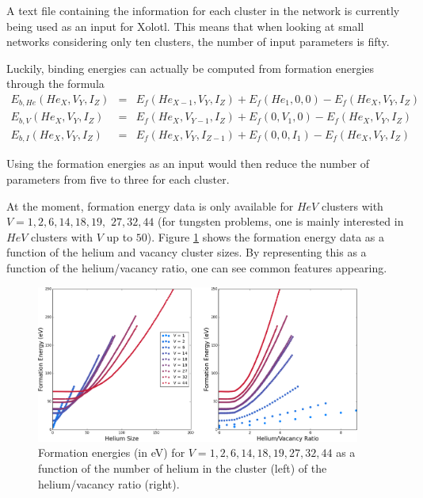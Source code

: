 \documentclass{article}
\begin{document}
A text file containing the information for each cluster in the network is
currently being used as an input for Xolotl. This means that when looking at
small networks considering only ten clusters, the number of input parameters
is fifty.

Luckily, binding energies can actually be computed from formation energies
through the formula
\begin{eqnarray}
    E_{b, He}(He_X, V_Y, I_Z) & = & E_f(He_{X-1}, V_Y, I_Z) + E_f(He_1, 0, 0) -
    E_f(He_X, V_Y, I_Z) \nonumber \\
    E_{b, V}(He_X, V_Y, I_Z) & = & E_f(He_X, V_{Y-1}, I_Z) + E_f(0, V_1, 0) -
    E_f(He_X, V_Y, I_Z) \\
    E_{b, I}(He_X, V_Y, I_Z) & = & E_f(He_X, V_Y, I_{Z-1}) + E_f(0, 0, I_1) -
    E_f(He_X, V_Y, I_Z) \nonumber
\end{eqnarray}

Using the formation energies as an input would then reduce the number
of parameters from five to three for each cluster. \newline

At the moment, formation energy data is only available for $HeV$ clusters with
$V = 1, 2, 6, 14, 18, 19,$ $27, 32, 44$ (for tungsten problems, one is mainly
interested in $HeV$ clusters with $V$ up to $50$). Figure \ref{fig:Ef} shows
the formation energy data as a function of the helium and vacancy cluster sizes.
By representing this as a function of the helium/vacancy ratio, one can see
common features appearing.

\begin{figure}[!htbp]
      \begin{center}
        \includegraphics[width=0.95\textwidth]{formationEnergiesUQ}
        \caption{Formation energies (in eV) for $V = 1, 2, 6, 14, 18, 19, 27, 32,
        44$ as a function of the number of helium in the cluster (left) of the
        helium/vacancy ratio (right). \label{fig:Ef}}
      \end{center}
\end{figure}
\end{document}

